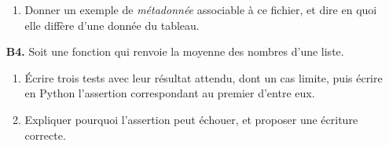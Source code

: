 \documentclass[10pt,a4paper]{article}
\begin{document}
\begin{enumerate}
\begin{enumerate}
\item Donner un exemple de \emph{métadonnée} associable à ce fichier, et dire en quoi elle
diffère d'une donnée du tableau.
\end{enumerate}
\par\vspace{1.2mm}
\needspace{22mm}
\item[\textbf{B4.}] Soit une fonction  qui renvoie la moyenne des nombres d'une liste.
\begin{enumerate}
\item Écrire trois tests avec leur résultat attendu, dont un cas limite, puis écrire en Python
l'assertion correspondant au premier d'entre eux.
\item Expliquer pourquoi l'assertion  peut échouer,
et proposer une écriture correcte.
\end{enumerate}
\par\vspace{1.2mm}
\end{enumerate}
\needspace{68mm}\par\vspace{3mm}
\end{document}

